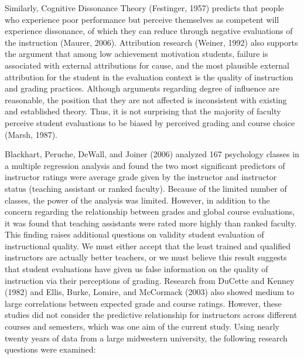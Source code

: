 \documentclass[,man,mask]{apa6}
\begin{document}
Similarly, Cognitive Dissonance Theory (Festinger, 1957) predicts that people who experience poor performance but perceive themselves as competent will experience dissonance, of which they can reduce through negative evaluations of the instruction (Maurer, 2006). Attribution research (Weiner, 1992) also supports the argument that among low achievement motivation students, failure is associated with external attributions for cause, and the most plausible external attribution for the student in the evaluation context is the quality of instruction and grading practices. Although arguments regarding degree of influence are reasonable, the position that they are not affected is inconsistent with existing and established theory. Thus, it is not surprising that the majority of faculty perceive student evaluations to be biased by perceived grading and course choice (Marsh, 1987).

Blackhart, Peruche, DeWall, and Joiner (2006) analyzed 167 psychology classes in a multiple regression analysis and found the two most significant predictors of instructor ratings were average grade given by the instructor and instructor status (teaching assistant or ranked faculty). Because of the limited number of classes, the power of the analysis was limited. However, in addition to the concern regarding the relationship between grades and global course evaluations, it was found that teaching assistants were rated more highly than ranked faculty. This finding raises additional questions on validity student evaluation of instructional quality. We must either accept that the least trained and qualified instructors are actually better teachers, or we must believe this result suggests that student evaluations have given us false information on the quality of instruction via their perceptions of grading. Research from DuCette and Kenney (1982) and Ellis, Burke, Lomire, and McCormack (2003) also showed medium to large correlations between expected grade and course ratings. However, these studies did not consider the predictive relationship for instructors across different courses and semesters, which was one aim of the current study. Using nearly twenty years of data from a large midwestern university, the following research questions were examined:
\end{document}
